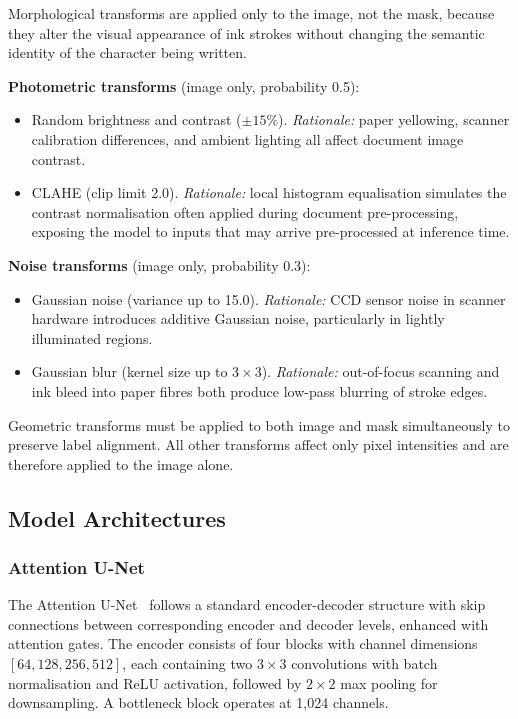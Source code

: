 \documentclass[a4paper,11pt]{article}
\begin{document}
\noindent Morphological transforms are applied only to the image, not the mask, because
they alter the visual appearance of ink strokes without changing the semantic identity of
the character being written.

\medskip
\noindent\textbf{Photometric transforms} (image only, probability 0.5):
\begin{itemize}[noitemsep]
    \item Random brightness and contrast ($\pm 15\%$). \emph{Rationale:} paper yellowing,
          scanner calibration differences, and ambient lighting all affect document image
          contrast.
    \item CLAHE (clip limit 2.0). \emph{Rationale:} local histogram equalisation simulates
          the contrast normalisation often applied during document pre-processing, exposing
          the model to inputs that may arrive pre-processed at inference time.
\end{itemize}

\medskip
\noindent\textbf{Noise transforms} (image only, probability 0.3):
\begin{itemize}[noitemsep]
    \item Gaussian noise (variance up to 15.0). \emph{Rationale:} CCD sensor noise in
          scanner hardware introduces additive Gaussian noise, particularly in lightly
          illuminated regions.
    \item Gaussian blur (kernel size up to $3 \times 3$). \emph{Rationale:} out-of-focus
          scanning and ink bleed into paper fibres both produce low-pass blurring of stroke
          edges.
\end{itemize}

\medskip
\noindent Geometric transforms must be applied to both image and mask simultaneously to
preserve label alignment. All other transforms affect only pixel intensities and are
therefore applied to the image alone.

\subsection{Model Architectures}

\subsubsection{Attention U-Net}

The Attention U-Net~\cite{oktay2018} follows a standard encoder-decoder structure with
skip connections between corresponding encoder and decoder levels, enhanced with attention
gates. The encoder consists of four blocks with channel dimensions
$[64, 128, 256, 512]$, each containing two $3 \times 3$ convolutions with batch
normalisation and ReLU activation, followed by $2 \times 2$ max pooling for
downsampling. A bottleneck block operates at 1,024 channels.
\end{document}
